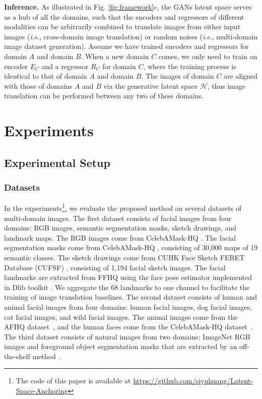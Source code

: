 \documentclass[10pt,journal,compsoc]{IEEEtran}
\newcommand{\red}[1]{\textcolor{red}{#1}}
\newcommand{\ie}{\textit{i}.\textit{e}.}
\begin{document}
{\noindent\textbf{Inference.}
As illustrated in Fig. \ref{fig:framework}\red{c}, the GANs latent space serves as a hub of all the domains, such that the encoders and regressors of different modalities can be arbitrarily combined to translate images from either input images (\ie, cross-domain image translation) or random noises (\ie, multi-domain image dataset generation).
Assume we have trained encoders and regressors for domain $A$ and domain $B$. When a new domain $C$ comes, we only need to train an encoder $E_C$ and a regressor $R_C$ for domain $C$, where the training process is identical to that of domain $A$ and domain $B$. The images of domain $C$ are aligned with those of domains $A$ and $B$ via the generative latent space $\mathcal{H}$, thus image translation can be performed between any two of these domains.


\section{Experiments}

\subsection{Experimental Setup}

\subsubsection{Datasets} 
In the experiments\footnote{The code of this paper is available at \url{https://github.com/siyuhuang/Latent-Space-Anchoring}}, we evaluate the proposed method on several datasets of multi-domain images. The first dataset consists of facial images from four domains: RGB images, semantic segmentation masks, sketch drawings, and landmark maps. The RGB images come from CelebAMask-HQ \cite{celebamaskhq}. The facial segmentation masks come from CelebAMask-HQ \cite{celebamaskhq}, consisting of 30,000 maps of 19 semantic classes. The sketch drawings come from CUHK Face Sketch FERET Database (CUFSF) \cite{cufsf1,cufsf2}, consisting of 1,194 facial sketch images. The facial landmarks are extracted from FFHQ \cite{stylegan} using the face pose estimator \cite{landmark} implemented in Dlib toolkit \cite{king2009dlib}. We aggregate the 68 landmarks to one channel to facilitate the training of image translation baselines. 
The second dataset consists of human and animal facial images from four domains: human facial images, dog facial images, cat facial images, and wild facial images. The animal images come from the AFHQ dataset~\cite{starganv2}, and the human faces come from the CelebAMask-HQ dataset~\cite{celebamaskhq}. 
The third dataset consists of natural images from two domains: ImageNet RGB images \cite{imagenet} and foreground object segmentation masks that are extracted by an off-the-shelf method~\cite{imagenetseg1,imagenetseg2}. 

}
\end{document}
